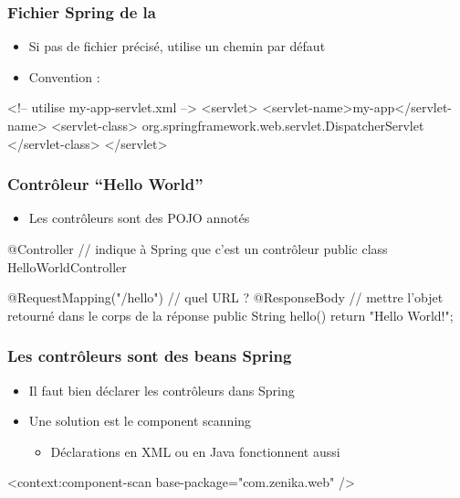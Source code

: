 \begin{frame}[fragile]
 \frametitle{Fichier Spring de la }
 
  \begin{itemize}
   \item Si pas de fichier précisé, utilise un chemin par défaut
   \item Convention : 
  \end{itemize}
  
 \begin{xmlcode}
<!-- utilise my-app-servlet.xml -->
<servlet>
  <servlet-name>my-app</servlet-name>
  <servlet-class>
    org.springframework.web.servlet.DispatcherServlet
  </servlet-class>  
</servlet>
 \end{xmlcode}
 
\end{frame}

\begin{frame}[fragile]
 \frametitle{Contrôleur ``Hello World''}
 
  \begin{itemize}
   \item Les contrôleurs sont des POJO annotés
  \end{itemize}
  
 \begin{javacode}
@Controller // indique \`a Spring que c'est un contr\^oleur
public class HelloWorldController {

  @RequestMapping("/hello") // quel URL ?
  @ResponseBody // mettre l'objet retourn\'e dans le corps de la r\'eponse
  public String hello() {
    return "Hello World!";
  }
  
}
 \end{javacode}
 
\end{frame}

\begin{frame}[fragile]
 \frametitle{Les contrôleurs sont des beans Spring}
 
  \begin{itemize}
   \item Il faut bien déclarer les contrôleurs dans Spring
   \item Une solution est le component scanning
   \begin{itemize}
    \item Déclarations en XML ou en Java fonctionnent aussi
   \end{itemize}
  \end{itemize}
  
 \begin{xmlcode}
<context:component-scan base-package="com.zenika.web" />
 \end{xmlcode}
 
\end{frame}

